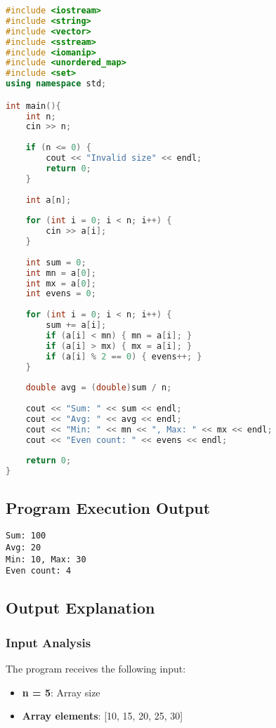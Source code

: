 \documentclass[12pt,a4paper]{article}
\begin{document}
\begin{lstlisting}[language=C++, caption=Generated Output: transpiled.cpp]
#include <iostream>
#include <string>
#include <vector>
#include <sstream>
#include <iomanip>
#include <unordered_map>
#include <set>
using namespace std;

int main(){
    int n;
    cin >> n;
    
    if (n <= 0) {
        cout << "Invalid size" << endl;
        return 0;
    }
    
    int a[n];
    
    for (int i = 0; i < n; i++) {
        cin >> a[i];
    }
    
    int sum = 0;
    int mn = a[0];
    int mx = a[0];
    int evens = 0;
    
    for (int i = 0; i < n; i++) {
        sum += a[i];
        if (a[i] < mn) { mn = a[i]; }
        if (a[i] > mx) { mx = a[i]; }
        if (a[i] % 2 == 0) { evens++; }
    }
    
    double avg = (double)sum / n;
    
    cout << "Sum: " << sum << endl;
    cout << "Avg: " << avg << endl;
    cout << "Min: " << mn << ", Max: " << mx << endl;
    cout << "Even count: " << evens << endl;
    
    return 0;
}
\end{lstlisting}

\subsection{Program Execution Output}

\begin{lstlisting}[caption=Final Output: output.txt]
Sum: 100
Avg: 20
Min: 10, Max: 30
Even count: 4
\end{lstlisting}

\subsection{Output Explanation}

\subsubsection{Input Analysis}
The program receives the following input:
\begin{itemize}
    \item \textbf{n = 5}: Array size
    \item \textbf{Array elements}: [10, 15, 20, 25, 30]
\end{itemize}
\end{document}
